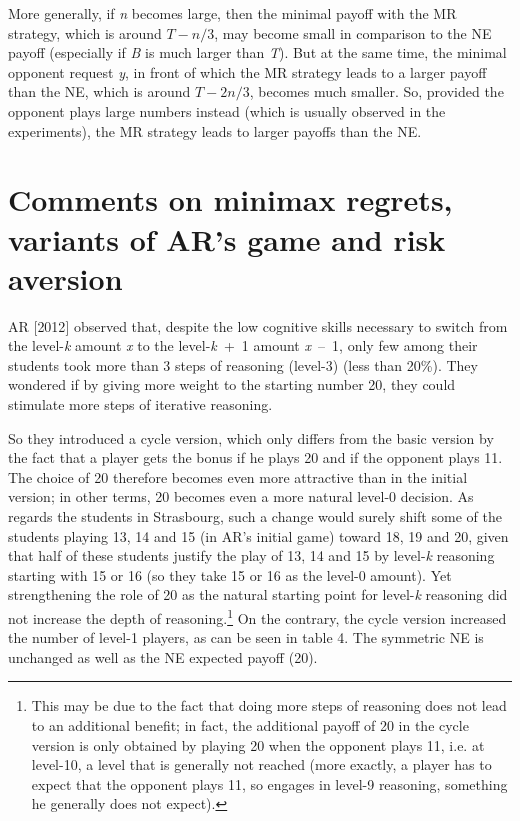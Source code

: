 \begin{Article}
\begin{refsection}[Umbhauer]
More generally, if \emph{n} becomes large, then the minimal payoff with
the MR strategy, which is around \(T - n/3\), may become small in
comparison to the NE payoff (especially if \emph{B} is much larger than
\emph{T}). But at the same time, the minimal opponent request \emph{y},
in front of which the MR strategy leads to a larger payoff than the NE,
which is around \(T - 2n/3\), becomes much smaller. So, provided the
opponent plays large numbers instead (which is usually observed in the
experiments), the MR strategy leads to larger payoffs than the NE.


\section{Comments on minimax regrets, variants of AR's game and risk aversion}
\label{section:Comments on minimax regrets}

AR {[}2012{]} observed that, despite the low cognitive skills necessary
to switch from the level-\emph{k} amount \emph{x} to the
level-\emph{k~}+~1 amount \emph{x~}--~1, only few among their students
took more than 3 steps of reasoning (level-3) (less than 20\%). They
wondered if by giving more weight to the starting number 20, they could
stimulate more steps of iterative reasoning.

So they introduced a cycle version, which only differs from the basic
version by the fact that a player gets the bonus if he plays 20 and if
the opponent plays 11. The choice of 20 therefore becomes even more
attractive than in the initial version; in other terms, 20 becomes even
a more natural level-0 decision. As regards the students in Strasbourg,
such a change would surely shift some of the students playing 13, 14 and
15 (in AR's initial game) toward 18, 19 and 20, given that half of these
students justify the play of 13, 14 and 15 by level-\emph{k} reasoning
starting with 15 or 16 (so they take 15 or 16 as the level-0 amount).
Yet strengthening the role of 20 as the natural starting point for
level-\emph{k} reasoning did not increase the depth of
reasoning.\footnote{This may be due to the fact that doing more steps of
  reasoning does not lead to an additional benefit; in fact, the
  additional payoff of 20 in the cycle version is only obtained by
  playing 20 when the opponent plays 11, i.e. at level-10, a level that
  is generally not reached (more exactly, a player has to expect that
  the opponent plays 11, so engages in level-9 reasoning, something he
  generally does not expect).} On the contrary, the cycle version
increased the number of level-1 players, as can be seen in table 4. The
symmetric NE is unchanged as well as the NE expected payoff (20).


\end{refsection}
\end{Article}
